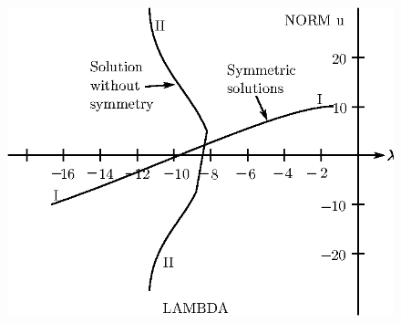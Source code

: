 \begin{figure}[H]
\centering
\includegraphics{vol79-fig/fig79-33.eps}
\smallskip
\caption{}\label{chap6-fig6.3}
\end{figure}\pageoriginale

\def\referencename{References}
\def\bibname{References}


